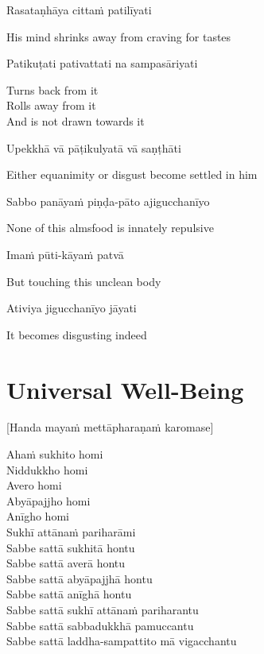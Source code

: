 Rasataṇhāya cittaṁ patilīyati

\begin{english}
  His mind shrinks away from craving for tastes
\end{english}

Patikuṭati pativattati na sampasāriyati

\begin{english}
  Turns back from it\\
  Rolls away from it\\
  And is not drawn towards it
\end{english}

Upekkhā vā pāṭikulyatā vā saṇṭhāti

\begin{english}
  Either equanimity or disgust become settled in him
\end{english}

\suttaRef{[AN 7.49]}

Sabbo panāyaṁ piṇḍa-pāto ajigucchanīyo

\begin{english}
  None of this almsfood is innately repulsive
\end{english}

Imaṁ pūti-kāyaṁ patvā

\begin{english}
  But touching this unclean body
\end{english}

Ativiya jigucchanīyo jāyati

\begin{english}
  It becomes disgusting indeed
\end{english}

\suttaRef{[Trad]}

\clearpage

\section{Universal Well-Being}
\label{universal-well-being}

\begin{center}
  [Handa mayaṁ mettāpharaṇaṁ karomase]
\end{center}

Ahaṁ sukhito homi\\
Niddukkho homi\\
Avero homi\\
Abyāpajjho homi\\
Anīgho homi\\
Sukhī attānaṁ pariharāmi\\
Sabbe sattā sukhitā hontu\\
Sabbe sattā averā hontu\\
Sabbe sattā abyāpajjhā hontu\\
Sabbe sattā anīghā hontu\\
Sabbe sattā sukhī attānaṁ pariharantu\\
Sabbe sattā sabbadukkhā pamuccantu\\
Sabbe sattā laddha-sampattito mā vigacchantu

